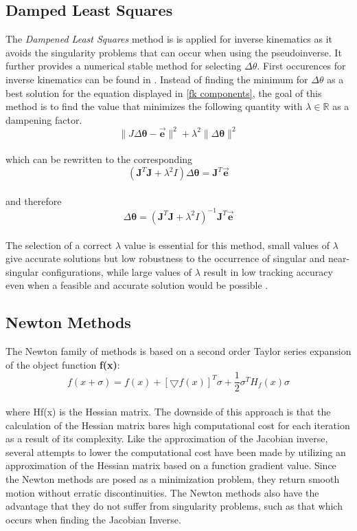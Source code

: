 \subsection{Damped Least Squares}
 The \textit{Dampened Least Squares} method is is applied for inverse kinematics as it avoids the singularity problems that can occur when using the pseudoinverse. It further provides a numerical stable method for selecting $\Delta\theta$. First occurences for inverse kinematics can be found in \cite{Wampler.1986,Nakamura.1986}.
Instead of finding the minimum for $\Delta\theta$ as a best solution for the equation displayed in \ref{fk components}, the goal of this method is to find the value that minimizes the following quantity with $\lambda \in \mathbb{R} $ as a dampening factor.\\
\begin{equation}
\parallel J\Delta\pmb{\theta}-\vec{\pmb{e}}\parallel^{2}+\lambda^{2}\parallel\Delta\pmb{\theta}\parallel^{2}
\end{equation}
\\which can be rewritten to the corresponding \\
\begin{equation}
(\pmb{J}^{T}\pmb{J}+\lambda^{2}I)\Delta\pmb{\theta}=\pmb{J}^{T}\vec{\pmb{e}}
\end{equation}
\\and therefore\\
\begin{equation}
\Delta\pmb{\theta}=(\pmb{J}^{T}\pmb{J}+\lambda^{2}I)^{-1}\pmb{J}^{T}\vec{\pmb{e}}
\end{equation}
\\The selection of a correct $\lambda$ value is essential for this method, small values of $\lambda$ give accurate solutions but low robustness to the occurrence of singular and near-singular configurations, while large  values of $\lambda$ result in low tracking accuracy even when a feasible and accurate solution would be possible  \cite{Chiaverini.1994,AndreasAristidouandJoanLasenby.2009}.

\subsection{Newton Methods}
The Newton family of methods is based on a second order Taylor series expansion of the object function \textbf{f(x)}:\\
\begin{equation}
f(x+\sigma)= f(x)+ [\bigtriangledown f(x)]^{T}\sigma + \frac{1}{2}\sigma^{T}H_{f}(x)\sigma
\end{equation}
\\where Hf(x) is the Hessian matrix. The downside of this approach is that the calculation of the Hessian matrix bares high computational cost for each iteration as a result of its complexity. Like the approximation of the Jacobian inverse, several attempts to lower the computational cost have been made by utilizing an approximation of the Hessian matrix based on a function gradient value.
Since the Newton methods are posed as a minimization problem, they return smooth motion without erratic discontinuities.
The Newton methods also have the advantage that they do not suffer from singularity problems, such as that which occurs when finding the Jacobian Inverse.
\newpage
